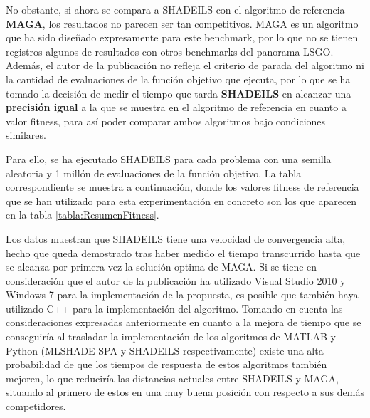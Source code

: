 No obstante, si ahora se compara a SHADEILS con el algoritmo de referencia \textbf{MAGA}, los resultados no parecen ser tan competitivos. MAGA es un algoritmo que ha sido diseñado expresamente para este benchmark, por lo que no se tienen registros algunos de resultados con otros benchmarks del panorama LSGO. Además, el autor de la publicación no refleja el criterio de parada del algoritmo ni la cantidad de evaluaciones de la función objetivo que ejecuta, por lo que se ha tomado la decisión de medir el tiempo que tarda \textbf{SHADEILS} en alcanzar una \textbf{precisión igual} a la que se muestra en el algoritmo de referencia en cuanto a valor fitness, para así poder comparar ambos algoritmos bajo condiciones similares.

Para ello, se ha ejecutado SHADEILS para cada problema con una semilla aleatoria y 1 millón de evaluaciones de la función objetivo. La tabla correspondiente se muestra a continuación, donde los valores fitness de referencia que se han utilizado para esta experimentación en concreto son los que aparecen en la tabla \ref{tabla:ResumenFitness}.

\begin{table}[h]
	\centering
	\caption{Tiempo (s) de SHADEILS en conseguir un error igual a MAGA }
	\label{tabla:ResumenMAGA-SHADEILS}
\end{table}

Los datos muestran que SHADEILS tiene una velocidad de convergencia alta, hecho que queda demostrado tras haber medido el tiempo transcurrido hasta que se alcanza por primera vez la solución optima de MAGA. Si se tiene en consideración que el autor de la publicación ha utilizado Visual Studio 2010 y Windows 7 para la implementación de la propuesta\cite{MAGA-BigOpt}, es posible que también haya utilizado C++ para la implementación del algoritmo. Tomando en cuenta las consideraciones expresadas anteriormente en cuanto a la mejora de tiempo que se conseguiría al trasladar la implementación de los algoritmos de MATLAB y Python (MLSHADE-SPA y SHADEILS respectivamente) existe una alta probabilidad de que los tiempos de respuesta de estos algoritmos también mejoren, lo que reduciría las distancias actuales entre SHADEILS y MAGA, situando al primero de estos en una muy buena posición con respecto a sus demás competidores.

